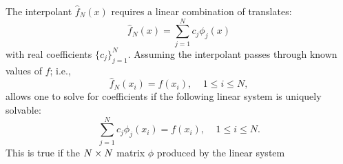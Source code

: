 \documentclass{report}
\begin{document}
{   The interpolant $\hat{f}_N(x)$ requires a linear combination of translates:  
        \begin{equation*}
        \hat{f}_N(x) = \sum_{j=1}^{N} c_j \phi_j(x)
        \end{equation*}
    with real coefficients $\{c_j\}_{j=1}^{N}$. Assuming the interpolant passes through
    known values of $f$; i.e., 
        \begin{equation*} 
        \hat{f}_N(x_i) = f(x_i),\ \ \ \ \ 1 \leq i \leq N, 
        \end{equation*}
    allows one to solve for coefficients if the following linear system is uniquely
    solvable: 
        \begin{equation*} 
        \sum_{j=1}^{N} c_j \phi_j(x_i) = f(x_i),\ \ \ \ \ 1
        \leq i \leq N. 
        \end{equation*} 
    This is true if the $N \times N$ matrix $\phi$ produced by the linear system
        \begin{align*} 

\end{align*}}
\end{document}

